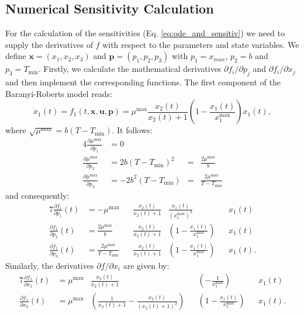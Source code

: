 \documentclass[10pt,A4paper]{article}
\newcommand{\mbx}{\mathbf{x}}
\newcommand{\mbu}{\mathbf{u}}
\newcommand{\mbp}{\mathbf{p}}
\begin{document}
\subsection*{Numerical Sensitivity Calculation}
For the calculation of the sensitivities (Eq. \ref{eq:ode_and_sensitiv}) we need to supply the derivatives of $f$ with respect to the parameters and state variables.
We define $\mbx=(x_1,x_2,x_3)$ and $\mbp=(p_1,p_2,p_3)$ with $p_1=x_{max}$, $p_2=b$ and $p_3=T_\text{min}$.
Firstly, we calculate the mathematical derivatives $\partial f_i/\partial p_j$ and $\partial f_i/\partial x_j$ and then implement the corresponding functions.
The first component of the Baranyi-Roberts model reads:
\begin{equation}
\label{eq:rob_bar_model}
    \dot x_1(t) = f_1(t, \mbx, \mbu, \mbp) = \mu^\text{max} \frac{x_2(t)}{x_2(t) + 1} \left(1 - \frac{x_1(t)}{x_1^\text{max}}\right) x_1(t),
\end{equation}
where $\sqrt{\mu^\text{max}}=b(T-T_\text{min})$. It follows:
\begin{alignat}{4}
    \frac{\partial\mu^\text{max}}{\partial p_1} &= 0\\
    \frac{\partial\mu^\text{max}}{\partial p_2} &= 2b(T-T_\text{min})^2 &=& \frac{2\mu^\text{max}}{b}\\
    \frac{\partial\mu^\text{max}}{\partial p_3} &= -2b^2(T-T_\text{min}) &=& \frac{2\mu^\text{max}}{T-T_\text{min}}
\end{alignat}
and consequently:
\begin{alignat}{7}
    \frac{\partial f_1}{\partial p_1}(t) &= - \mu^\text{max} &&\frac{x_2(t)}{x_2(t) + 1} &\frac{x_1(t)}{\left(x_1^\text{max}\right)^2} &&x_1(t)\\
    \frac{\partial f_1}{\partial p_2}(t) &= \frac{2\mu^\text{max}}{b} &&\frac{x_2(t)}{x_2(t) + 1} &\left(1 - \frac{x_1(t)}{x_1^\text{max}}\right) &&x_1(t)\\
    \frac{\partial f_1}{\partial p_3}(t) &= \frac{2\mu^\text{max}}{T-T_\text{min}} &&\frac{x_2(t)}{x_2(t) + 1} &\left(1 - \frac{x_1(t)}{x_1^\text{max}}\right) &&x_1(t).
\end{alignat}
Similarly, the derivatives $\partial f/\partial x_i$ are given by:
\begin{alignat}{7}
    \frac{\partial f_1}{\partial x_1}(t) &= \mu^\text{max} &\frac{x_2(t)}{x_2(t) + 1} && \left(-\frac{1}{x_1^\text{max}}\right) &&x_1(t)\\
    \frac{\partial f_1}{\partial x_2}(t) &= \mu^\text{max} &\left(\frac{1}{x_2(t) + 1} - \frac{x_2(t)}{(x_2(t) + 1)^2}\right) && \left(1 - \frac{x_1(t)}{x_1^\text{max}}\right) &&x_1(t).
\end{alignat}
\end{document}

